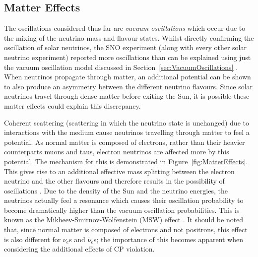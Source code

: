 \subsection{Matter Effects}\label{sec:MatterEffects}

The oscillations considered thus far are \textit{vacuum oscillations} which occur due to the mixing of the neutrino mass and flavour states.  Whilst directly confirming the oscillation of solar neutrinos, the SNO experiment (along with every other solar neutrino experiment) reported more oscillations than can be explained using just the vacuum oscillation model discussed in Section~\ref{sec:VacuumOscillations} \cite{Bahcall2002,Smirnov2003}.  When neutrinos propagate through matter, an additional potential can be shown to also produce an asymmetry between the different neutrino flavours.  Since solar neutrinos travel through dense matter before exiting the Sun, it is possible these matter effects could explain this discrepancy.

Coherent scattering (scattering in which the neutrino state is unchanged) due to interactions with the medium cause neutrinos travelling through matter to feel a potential.  As normal matter is composed of electrons, rather than their heavier counterparts muons and taus, electron neutrinos are affected more by this potential.  The mechanism for this is demonstrated in Figure~\ref{fig:MatterEffects}.  This gives rise to an additional effective mass splitting between the electron neutrino and the other flavours and therefore results in the possibility of oscillations \cite{Wolfenstein1978}.  Due to the density of the Sun and the neutrino energies, the neutrinos actually feel a resonance which causes their oscillation probability to become dramatically higher than the vacuum oscillation probabilities.  This is known as the Mikheev-Smirnov-Wolfenstein (MSW) effect \cite{MS1985,MS1986}.  It should be noted that, since normal matter is composed of electrons and not positrons, this effect is also different for $\nu_e$s and $\bar{\nu}_e$s; the importance of this becomes apparent when considering the additional effects of CP violation.

